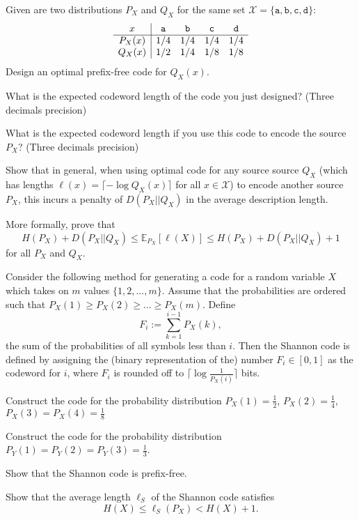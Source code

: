 \documentclass[a4paper,10pt,landscape,twocolumn]{scrartcl}
\begin{document}
\begin{exercise}
\begin{subex}[(2pt)]
Given are two distributions $P_X$ and $Q_X$ for the same set $\mathcal{X} = \{\mathtt{a,b,c,d}\}$:
\[
\begin{array}{c | c c c c}
x & \mathtt{a}&\mathtt{b}&\mathtt{c}&\mathtt{d}\\\hline
P_X(x) & 1/4&1/4&1/4&1/4\\
Q_X(x) & 1/2&1/4&1/8&1/8\\
\end{array}
\]
Design an optimal prefix-free code for $Q_X(x)$.
\end{subex}
\begin{subex}[(4pt)]
What is the expected codeword length of the code you just designed? (Three decimals precision)
\end{subex}
\begin{subex}[(4pt)]
What is the expected codeword length if you use this code to encode the source $P_X$? (Three decimals precision)
\end{subex}
\begin{subex}[(4pt)]
Show that in general, when using optimal code for any source source $Q_X$ (which has lengths $\ell(x) = \lceil -\log Q_X(x) \rceil$ for all $x \in \mathcal{X}$) to encode another source $P_X$, this incurs a penalty of $D(P_X||Q_X)$ in the average description length.

More formally, prove that
\[
H(P_X) + D(P_X||Q_X) \leq \mathbb{E}_{P_X}[\ell(X)] \leq H(P_X) + D(P_X||Q_X) + 1
\]
for all $P_X$ and $Q_X$.
\end{subex}
\end{exercise}




\begin{exercise}
Consider the following method for generating a code for a random variable $X$ which takes on $m$ values $\{1,2,...,m\}$. Assume that the probabilities are ordered such that $P_X(1) \geq P_X(2) \geq ... \geq P_X(m)$. Define
\[
F_i := \sum_{k=1}^{i-1} P_X(k),
\]
the sum of the probabilities of all symbols less than $i$. Then the Shannon code is defined by assigning the (binary representation of the) number $F_i \in [0,1]$ as the codeword for $i$, where $F_i$ is rounded off to $\lceil \log\frac{1}{P_X(i)}\rceil$ bits.
	\begin{subex}[(1pt)]
	Construct the code for the probability distribution $P_X(1) = \frac{1}{2}$, $P_X(2) = \frac{1}{4}$, $P_X(3) = P_X(4) = \frac{1}{8}$
	\end{subex}
	\begin{subex}[(1pt)]
	Construct the code for the probability distribution $P_Y(1) = P_Y(2) = P_Y(3) = \frac{1}{3}$.
	\end{subex}
	\begin{subex}[(2pt)]
	Show that the Shannon code is prefix-free.
	\end{subex}
	\begin{subex}[(2pt)]
	Show that the average length $\ell_S$ of the Shannon code satisfies
	\[
	H(X) \leq \ell_S(P_X) < H(X) + 1.
	\]
	\end{subex}
\end{exercise}
\end{document}
